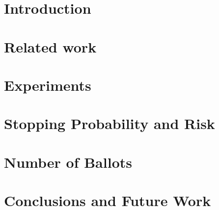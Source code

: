 \documentclass{beamer}
\begin{document}
\section{Introduction}
\label{sec:intro}


\section{Related work}
\label{sec:related}


%

\section{Experiments}
\label{sec:expts}


\section{Stopping Probability and Risk}
\label{sec:results1}


\section{Number of Ballots}
\label{sec:results2}


\section{Conclusions and Future Work}
\label{sec:conc}




%
%
%


%
\end{document}
